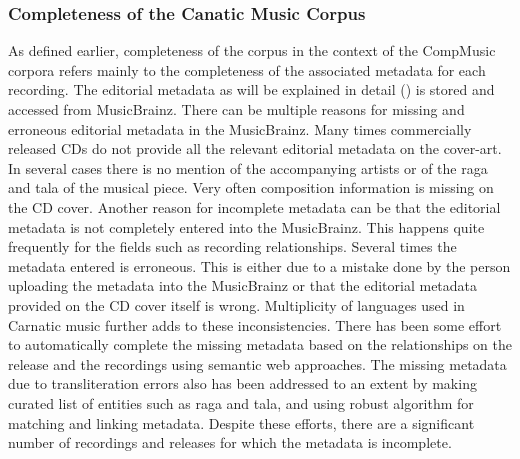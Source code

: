\subsubsection{Completeness of the Canatic Music Corpus}
\label{sec:corpus_completeness_of_completeness_of_carnatic_music_corpus}

As defined earlier, completeness of the corpus in the context of the CompMusic corpora refers mainly to the completeness of the associated metadata
for each recording. The editorial metadata as will be explained in detail () is stored and accessed from MusicBrainz. There can be multiple reasons for missing and erroneous editorial metadata in the MusicBrainz. Many times commercially released CDs do not provide all the relevant editorial metadata on the cover-art. In several cases there is no mention of the accompanying artists or of the \gls{raga} and \gls{tala} of the musical piece. Very often composition information is missing on the CD cover. Another reason for incomplete metadata can be that the editorial metadata is not completely entered into the MusicBrainz. This happens quite frequently for the fields such as recording relationships. Several times the metadata entered is erroneous. This is either due to a mistake done by the person uploading the metadata into the MusicBrainz or that the editorial metadata provided on the CD cover itself is wrong. Multiplicity of languages used in Carnatic music further adds to these inconsistencies. There has been some effort to automatically complete the missing metadata based on the relationships on the release and the recordings using semantic web approaches. The missing metadata due to transliteration errors also has been addressed to an extent by making curated list of entities such as \gls{raga} and \gls{tala}, and using robust algorithm for matching and linking metadata. Despite these efforts, there are a significant number of recordings and releases for which the metadata is incomplete.


